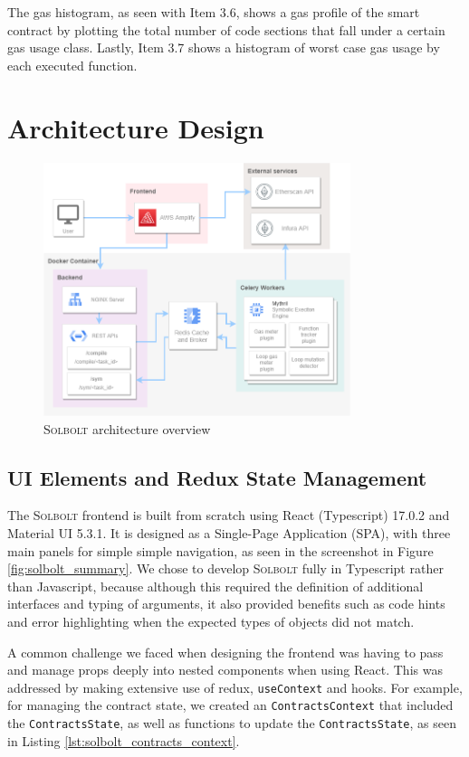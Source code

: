 The gas histogram,
as seen with Item 3.6, shows a gas profile of the smart contract by plotting the total number
of code sections that fall under a certain gas usage class. Lastly, Item 3.7 shows a histogram
of worst case gas usage by each executed function.

\clearpage
\section{Architecture Design}

\begin{figure}[h]
  \centering
  \includegraphics[width=0.8\textwidth]{./figures/implementation/architecture}
  \caption{\textcolor{NavyBlue}{\textsc{Solbolt}} architecture overview}
  \label{fig:solbolt_architecture}
\end{figure}

\subsection{UI Elements and Redux State Management}
The \textcolor{NavyBlue}{\textsc{Solbolt}} frontend is built from scratch using React (Typescript) 17.0.2 and Material UI 5.3.1.
It is designed as a Single-Page Application (SPA), with three main panels for simple
simple navigation, as seen in the screenshot in Figure \ref{fig:solbolt_summary}.
We chose to develop \textcolor{NavyBlue}{\textsc{Solbolt}} fully in Typescript rather than Javascript, because although
this required the definition of additional interfaces and typing of arguments, it also
provided benefits such as code hints and error highlighting when the expected types of objects
did not match.

A common challenge we faced when designing the frontend was having to pass and manage props
deeply into nested components when using React.
This was addressed by making extensive use of redux, \texttt{useContext} and hooks.
For example, for managing the contract state, we created an \texttt{ContractsContext} that
included the \texttt{ContractsState}, as well as functions to update the 
\texttt{ContractsState}, as seen in Listing \ref{lst:solbolt_contracts_context}.


